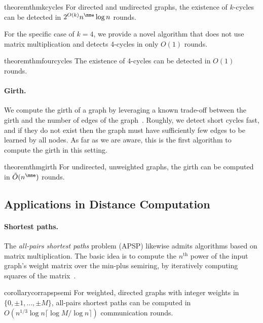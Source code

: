 \begin{restatable}{theorem}{thmkcycles}\label{thm:k-cycles}
For directed and undirected graphs, the existence of $k$-cycles can be detected in $2^{O(k)} n^{\mme} \log n$ rounds.
\end{restatable}

For the specific case of $k=4$, we provide a novel algorithm that does not use matrix multiplication and detects 4-cycles in only $O(1)$ rounds.

\begin{restatable}{theorem}{thmfourcycles}\label{thm:4-cycles}
The existence of 4-cycles can be detected in $O(1)$ rounds.
\end{restatable}




\paragraph{Girth.}
We compute the girth of a graph by leveraging a known trade-off between the girth and the number of edges of the graph~\cite{Matousek02_geometry}. Roughly, we detect short cycles fast, and if they do not exist then the graph must have sufficiently few edges to be learned by all nodes. As far as we are aware, this is the first algorithm to compute the girth in this setting.

\begin{restatable}{theorem}{thmgirth}
For undirected, unweighted graphs, the girth can be computed in $\tilde{O}(n^{\mme})$ rounds.
\end{restatable}


\subsection{Applications in Distance Computation}

\paragraph{Shortest paths.}
The \emph{all-pairs shortest paths} problem (APSP) likewise admits algorithms based on matrix multiplication. The basic idea is to compute the $n^\text{th}$ power of the input graph's weight matrix over the min-plus semiring, by iteratively computing squares of the matrix~\cite{furman1970application, Munro197156, fm1971boolean}. 

\begin{restatable}{corollary}{corrapspsemi}\label{thm:apsp-semiring}
For weighted, directed graphs with integer weights in $\{0 ,\pm 1, \dotsc, \pm M \}$, all-pairs shortest paths can be computed in $O(n^{1/3} \log n \lceil\log M/\log n\rceil)$ communication rounds.
\end{restatable}

